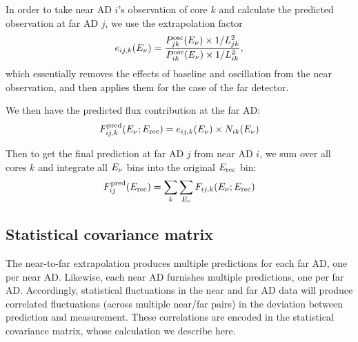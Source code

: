 \documentclass[../thesis.tex]{subfiles}
\begin{document}
In order to take near AD $i$'s observation of core $k$ and calculate the predicted observation at far AD $j$, we use the extrapolation factor
\begin{equation}
  \label{eq:fitExtrapFactor}
  e_{ij,k}(E_\mathrm{\nu}) = \frac{P^{\mathrm{osc}}_{jk}(E_\mathrm{\nu}) \times 1/L^2_{jk}}
  {P^{\mathrm{osc}}_{ik}(E_\mathrm{\nu}) \times 1/L^2_{ik}},
\end{equation}
which essentially removes the effects of baseline and oscillation from the near observation, and then applies them for the case of the far detector.

We then have the predicted flux contribution at the far AD:
\begin{equation*}
  F^{\mathrm{pred}}_{ij,k}(E_\mathrm{\nu}; E_\mathrm{rec}) = e_{ij,k}(E_\mathrm{\nu}) \times N_{ik}(E_\mathrm{\nu})
\end{equation*}

Then to get the final prediction at far AD $j$ from near AD $i$, we sum over all cores $k$ and integrate all $E_\mathrm{\nu}$ bins into the original $E_\mathrm{rec}$ bin:
\begin{equation*}
  F^{\mathrm{pred}}_{ij}(E_\mathrm{rec}) = \sum_k \sum_{E_\mathrm{\nu}} F_{ij,k}(E_\mathrm{\nu}; E_\mathrm{rec})
\end{equation*}

\begin{comment}
Near site spectrum divided into Erec bins.

For each bin, convert to true energy using matrix.

For each true energy bin (from this single Erec bin), determine fraction from each core using baselines and power.

For each core, undo 1/L^2 and oscillation, then apply them for each far site

Sum up cores, repeat for all Etrue bins (still for this single Erec bin)

Integrate back into original Erec bin at far site. Repeat for all bins.

In this way we get 16 predictions.
\end{comment}

\subsection{Statistical covariance matrix}
\label{sec:fitStatCovMat}

The near-to-far extrapolation produces multiple predictions for each far AD, one per near AD. Likewise, each near AD furnishes multiple predictions, one per far AD. Accordingly, statistical fluctuations in the near and far AD data will produce correlated fluctuations (across multiple near/far pairs) in the deviation between prediction and measurement. These correlations are encoded in the statistical covariance matrix, whose calculation we describe here.
\end{document}

